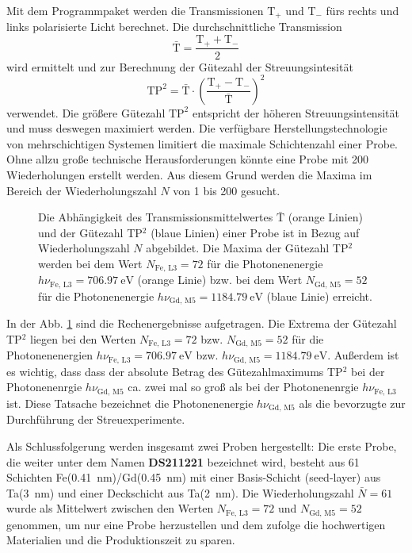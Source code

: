 \noindent
Mit dem Programmpaket werden die Transmissionen T$_+$ und T$_-$ fürs rechts und links polarisierte Licht berechnet. Die durchschnittliche Transmission
\begin{equation}
    \bar{\text{T}} = \frac{\text{T}_+ + \text{T}_-}{2}
\end{equation}
wird ermittelt und zur Berechnung der Gütezahl der Streuungsintesität
\begin{equation}
    \text{TP}^2 = \bar{\text{T}}\cdot\left(\frac{\text{T}_+ - \text{T}_-}{\bar{\text{T}}}\right)^2
\end{equation}
verwendet. Die größere Gütezahl $\text{TP}^2$ entspricht der höheren Streuungsintensität und muss deswegen maximiert werden. Die verfügbare Herstellungstechnologie von mehrschichtigen Systemen limitiert die maximale Schichtenzahl einer Probe. Ohne allzu große technische Herausforderungen könnte eine Probe mit 200 Wiederholungen erstellt werden. Aus diesem Grund werden die Maxima im Bereich der Wiederholungszahl $N$ von 1 bis 200 gesucht.
\begin{figure}[H]
    \centering
    
    \caption{Die Abhängigkeit des Transmissionsmittelwertes $\bar{\text{T}}$ (orange Linien) und der Gütezahl TP$^2$ (blaue Linien) einer Probe ist in Bezug auf Wiederholungszahl $N$ abgebildet. Die Maxima der Gütezahl TP$^2$ werden bei dem Wert $N_{\text{Fe, L3}}=72$ für die Photonenenergie $h\nu_{\text{Fe, L3}}=\SI{706,97}{\eV}$ (orange Linie) bzw. bei dem Wert $N_{\text{Gd, M5}}=52$ für die Photonenenergie $h\nu_{\text{Gd, M5}}=\SI{1184,79}{\eV}$ (blaue Linie) erreicht.}
    \label{fig:proben_vergleich_centered}
\end{figure}
\noindent
In der Abb. \ref{fig:proben_vergleich_centered} sind die Rechenergebnisse aufgetragen. Die Extrema der Gütezahl TP$^2$ liegen bei den Werten $N_{\text{Fe, L3}}=72$  bzw. $N_{\text{Gd, M5}}=52$ für die Photonenenergien $h\nu_{\text{Fe, L3}}=\SI{706,97}{\eV}$ bzw. $h\nu_{\text{Gd, M5}}=\SI{1184,79}{\eV}$. Außerdem ist es wichtig, dass dass der absolute Betrag des Gütezahlmaximums TP$^2$ bei der Photonenenrgie $h\nu_{\text{Gd, M5}}$ ca. zwei mal so groß als bei der Photonenenrgie $h\nu_{\text{Fe, L3}}$ ist. Diese Tatsache bezeichnet die Photonenenergie $h\nu_{\text{Gd, M5}}$ als die bevorzugte zur Durchführung der Streuexperimente.

\noindent
Als Schlussfolgerung werden insgesamt zwei Proben hergestellt:
Die erste Probe, die weiter unter dem Namen \textbf{DS211221} bezeichnet wird, besteht aus 61 Schichten Fe(\SI{0.41}{\nano\meter})/Gd(\SI{0.45}{\nano\meter}) mit einer Basis-Schicht (seed-layer) aus Ta(\SI{3}{\nano\meter}) und einer Deckschicht aus Ta(\SI{2}{\nano\meter}). Die Wiederholungszahl $\bar{N} = 61$ wurde als Mittelwert zwischen den Werten $N_{\text{Fe, L3}}=72$ und $N_{\text{Gd, M5}}=52$ genommen, um nur eine Probe herzustellen und dem zufolge die hochwertigen Materialien und die Produktionszeit zu sparen.

